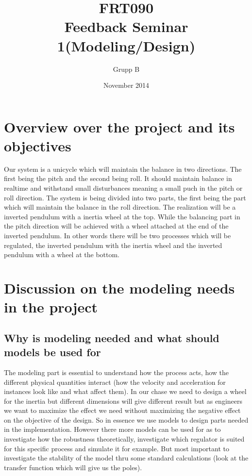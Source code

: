 \documentclass{article}
\author{Grupp B}
\title{FRT090 \\Feedback Seminar 1(Modeling/Design)  }				%
\date{November 2014}
\begin{document}
\maketitle	%
\newpage


\section {Overview over the project and its objectives}

Our system is a unicycle which will maintain the balance in two directions. The first being the pitch and the second being roll. It should maintain balance in realtime and withstand small disturbances meaning a small puch in the pitch or roll direction. The system is being divided into two parts, the first being the part which will maintain the balance in the roll direction. The realization will be a inverted pendulum with a inertia wheel at the top. While the balancing part in the pitch direction will be achieved with a wheel attached at the end of the inverted pendulum. In other words there will be two processes which will be regulated, the inverted pendulum  with the inertia wheel and the inverted pendulum with a wheel at the bottom. 



\section{Discussion on the modeling needs in the project}

\subsection{Why is modeling needed and what should models be used for}

The modeling part is essential to understand how the process acts, how the different physical quantities interact (how the velocity and acceleration for instances look like and what affect them). In our chase we need to design a wheel for the inertia but different dimensions will give different result but as engineers we want to maximize the effect we need without maximizing the negative effect on the objective of the design. So in essence we use models to design parts needed in the implementation. However there more models can be used for as to investigate how the robustness theoretically, investigate which regulator is suited for this specific process and simulate it for example. But most important to investigate the stability of the model thru some standard calculations (look at the transfer function which will give us the poles).   
\end{document}
